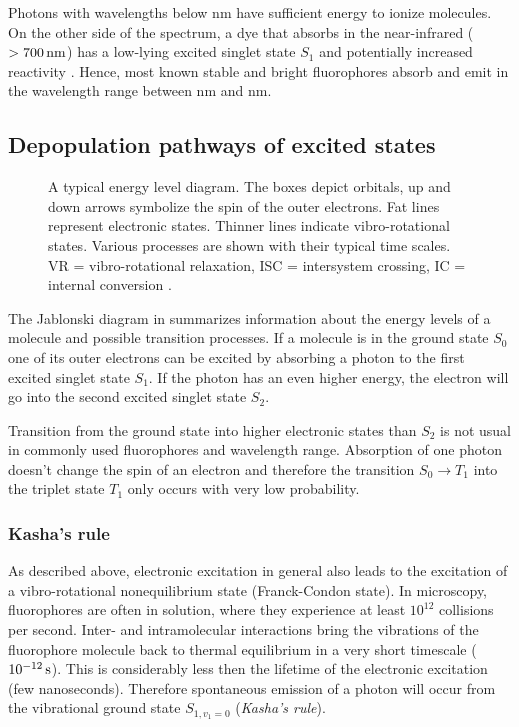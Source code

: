 Photons with wavelengths below \unit[200]{nm} have sufficient energy     
to ionize molecules. On the other side of the spectrum, a dye that
absorbs in the near-infrared ($\unit[>700]{nm}$) has a low-lying
excited singlet state $S_1$ and potentially increased reactivity
\citep{Sauer2011}. Hence, most known stable and bright fluorophores
absorb and emit in the wavelength range between \unit[300]{nm} and
\unit[700]{nm}.


\subsection{Depopulation pathways of excited states}
\begin{figure}[!hbt]
  \centering
  \def\svgscale{.8}
  {\small
}
  \caption{A typical energy level diagram. The boxes depict orbitals,
    up and down arrows symbolize the spin of the outer electrons. Fat
    lines represent electronic states. Thinner lines indicate
    vibro-rotational states. Various processes are shown with their
    typical time scales. VR = vibro-rotational relaxation, ISC =
    intersystem crossing, IC = internal conversion \cite[inspired
    from][]{Haken2006}.}
  \label{fig:flu-level}
\end{figure}
The Jablonski diagram in  summarizes information    
about the energy levels of a molecule and possible transition
processes. If a molecule is in the ground state $S_0$ one of its outer
electrons can be excited by absorbing a photon to the first excited
singlet state $S_1$.  If the photon has an even higher energy, the
electron will go into the second excited singlet state $S_2$.

Transition from the ground state into higher electronic states than
$S_2$ is not usual in commonly used fluorophores and wavelength range.
Absorption of one photon doesn't change the spin of an electron and
therefore the transition $S_0\rightarrow T_1$ into the triplet state
$T_1$ only occurs with very low probability.

\subsubsection{Kasha's rule}
As described above, electronic excitation in general also leads to the   
excitation of a vibro-rotational nonequilibrium state (Franck-Condon
state). In microscopy, fluorophores are often in solution, where they
experience at least $10^{12}$ collisions per second. Inter- and
intramolecular interactions bring the vibrations of the fluorophore
molecule back to thermal equilibrium in a
very short timescale ($\unit[10^{-12}]{s}$). This is considerably less
then the lifetime of the electronic excitation (few
nanoseconds). Therefore spontaneous emission of a photon will occur
from the vibrational ground state $S_{1,v_1=0}$ (\emph{Kasha's rule}).

